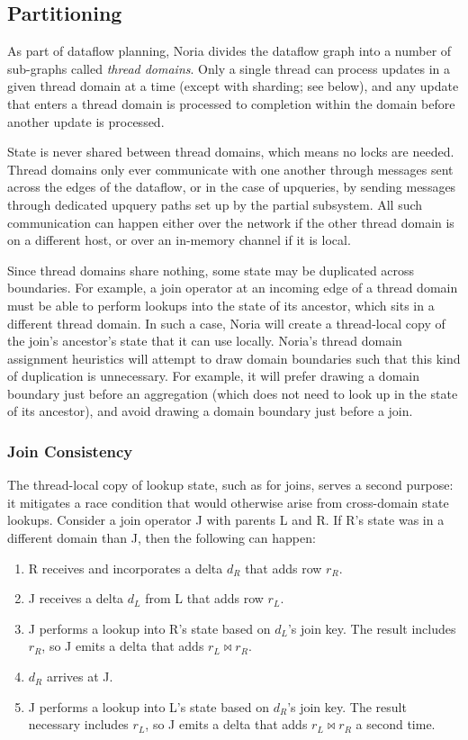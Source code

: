 \subsection{Partitioning}

As part of dataflow planning, Noria divides the dataflow graph into a number of
sub-graphs called \textit{thread domains}. Only a single thread can process
updates in a given thread domain at a time (except with sharding; see below),
and any update that enters a thread domain is processed to completion within
the domain before another update is processed.

State is never shared between thread domains, which means no locks are needed.
Thread domains only ever communicate with one another through messages sent
across the edges of the dataflow, or in the case of upqueries, by sending
messages through dedicated upquery paths set up by the partial subsystem. All
such communication can happen either over the network if the other thread domain
is on a different host, or over an in-memory channel if it is local.

Since thread domains share nothing, some state may be duplicated across
boundaries. For example, a join operator at an incoming edge of a thread domain
must be able to perform lookups into the state of its ancestor, which sits in a
different thread domain. In such a case, Noria will create a thread-local copy
of the join's ancestor's state that it can use locally. Noria's thread domain
assignment heuristics will attempt to draw domain boundaries  such that this
kind of duplication is unnecessary. For example, it will prefer drawing a domain
boundary just before an aggregation (which does not need to look up in the state
of its ancestor), and avoid drawing a domain boundary just before a join.

\subsubsection{Join Consistency}
\label{s:join-state-dupe}

The thread-local copy of lookup state, such as for joins, serves a second
purpose: it mitigates a race condition that would otherwise arise from
cross-domain state lookups. Consider a join operator J with parents L and R. If
R's state was in a different domain than J, then the following can happen:

\begin{enumerate}
  \item R receives and incorporates a delta $d_R$ that adds row $r_R$.
  \item J receives a delta $d_L$ from L that adds row $r_L$.
  \item J performs a lookup into R's state based on $d_L$'s join key. The result
        includes $r_R$, so J emits a delta that adds $r_L \bowtie r_R$.
  \item $d_R$ arrives at J.
  \item J performs a lookup into L's state based on $d_R$'s join key. The result
        necessary includes $r_L$, so J emits a delta that adds $r_L \bowtie r_R$
        a second time.
\end{enumerate}

